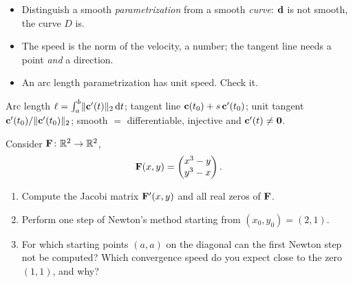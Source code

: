 \begin{solution}
\begin{trap}
\begin{itemize}
\item Distinguish a smooth \emph{parametrization} from a smooth \emph{curve}: $\mathbf{d}$ is not smooth, the curve $D$ is.
\item The speed is the norm of the velocity, a number; the tangent line needs a point \emph{and} a direction.
\item An arc length parametrization has unit speed. Check it.
\end{itemize}
\end{trap}
\begin{heart}
Arc length $\ell=\int_a^b\lVert \mathbf{c}'(t)\rVert_2\,\mathrm{d} t$; tangent line $\mathbf{c}(t_0)+s\,\mathbf{c}'(t_0)$; unit tangent $\mathbf{c}'(t_0)/\lVert \mathbf{c}'(t_0)\rVert_2$; smooth $=$ differentiable, injective and $\mathbf{c}'(t)\neq\mathbf{0}$.
\end{heart}
\end{solution}

Consider $\mathbf{F}\colon\mathbb{R}^2\to\mathbb{R}^2$,
\[
\mathbf{F}(x,y)=\begin{pmatrix}x^3-y\\y^3-x\end{pmatrix}.
\]
\begin{enumerate}
\item Compute the Jacobi matrix $\mathbf{F}'(x,y)$ and all real zeros of $\mathbf{F}$.
\item Perform one step of Newton's method starting from $(x_0,y_0)=(2,1)$.
\item For which starting points $(a,a)$ on the diagonal can the first Newton step not be computed? Which convergence speed do you expect close to the zero $(1,1)$, and why?
\end{enumerate}

